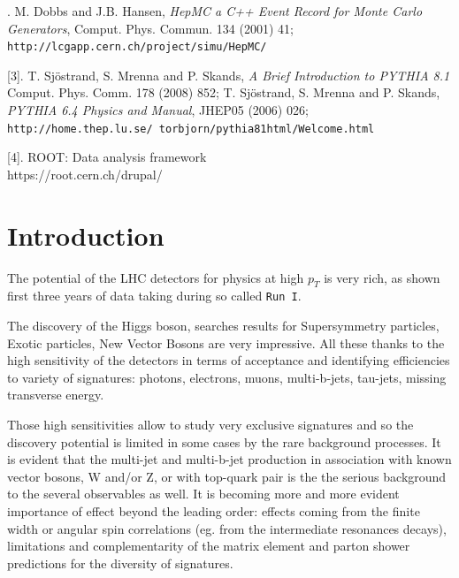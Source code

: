 \begin{titlepage}
[2]. M. Dobbs and J.B. Hansen, {\it  HepMC a C++ Event Record for Monte Carlo Generators},
Comput. Phys. Commun. 134 (2001) 41;\\ {\tt http://lcgapp.cern.ch/project/simu/HepMC/}

[3]. T. Sjöstrand, S. Mrenna and P. Skands, {\it A Brief Introduction to PYTHIA 8.1} Comput. Phys. Comm. 178 (2008) 852;
T. Sjöstrand, S. Mrenna and P. Skands, {\it PYTHIA 6.4 Physics and Manual}, JHEP05 (2006) 026;\\
{\tt http://home.thep.lu.se/~torbjorn/pythia81html/Welcome.html}

[4]. ROOT: Data analysis framework \\ https://root.cern.ch/drupal/


\end{titlepage}

 


\boldmath
\section{Introduction}
\unboldmath

The potential of the LHC detectors for physics at high  $p_T$ is
very rich, as shown first three years of data taking during so called {\tt Run I}.
 
The discovery of the Higgs boson, searches results for Supersymmetry particles,
Exotic particles, New Vector Bosons are very impressive. 
All these thanks to the high sensitivity of the detectors
in terms of acceptance and identifying efficiencies to variety of 
signatures: photons, electrons, muons, multi-b-jets, tau-jets, missing
transverse energy.

Those high sensitivities allow to study very
exclusive signatures and so the discovery potential is 
limited in some cases by the rare background processes.
It is  evident that the multi-jet and multi-b-jet
production in association with known vector bosons, W and/or Z, or with
top-quark pair is the the serious background to the several
observables as well. 
It is becoming more and more evident importance of effect beyond the leading order:
effects coming from the finite width or angular spin correlations (eg. from the 
intermediate resonances decays), limitations and complementarity of the matrix
element and parton shower predictions for the diversity of signatures.

